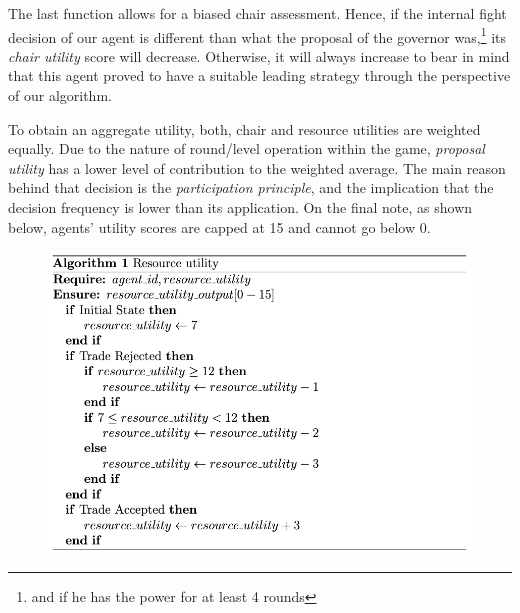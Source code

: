 The last function allows for a biased chair assessment. Hence, if the internal fight decision of our agent is different than what the proposal of the governor was,\footnote{and if he has the power for at least 4 rounds} its \textit{chair utility }score will decrease. Otherwise, it will always increase to bear in mind that this agent proved to have a suitable leading strategy through the perspective of our algorithm.

To obtain an aggregate utility, both, chair and resource utilities are weighted equally. Due to the nature of round/level operation within the game, \textit{proposal utility} has a lower level of contribution to the weighted average. The main reason behind that decision is the \textit{participation principle}, and the implication that the decision frequency is lower than its application. On the final note, as shown below, agents' utility scores are capped at 15 and cannot go below 0.                    


\begin{figure}[htb]
    \centering
    \includegraphics[scale=0.7]{006_team_3_agent_design/FIGS/Algo1.png}
    \label{fig:algo1}
\end{figure}



